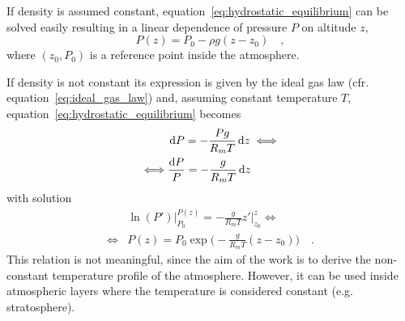 \documentclass[a4paper,10pt,twocolumn,\classoptions]{article}
\begin{document}
If density is assumed constant, equation~\eqref{eq:hydrostatic_equilibrium} can be solved easily resulting in a linear dependence of pressure $P$ on altitude $z$, %
\begin{equation}
  \label{eq:pressure_constant_density}
  P(z) = P_0 - \rho g (z - z_0)
  \quad ,
\end{equation}
where $(z_0, P_0)$ is a reference point inside the atmosphere.

If density is not constant its expression is given by the ideal gas law (cfr. equation~\eqref{eq:ideal_gas_law}) and, assuming constant temperature $T$, equation~\eqref{eq:hydrostatic_equilibrium} becomes
\begin{equation}
  \label{eq:hydrostatic_equilibrium_ideal_gas_law_constant_temperature}
  \begin{split}
    & \odif{P} = - \frac{P g}{R_m T} \odif{z} \iff \\
    \iff & \frac{\odif{P}}{P} = - \frac{g}{R_m T} \odif{z}
  \end{split}
\end{equation}
with solution
\begin{equation}
  \label{eq:pressure_constant_temperature}
  \begin{split}
    & \ln(P') \bigg|_{P_0}^{P(z)} = - \frac{g}{R_m T} z' \bigg|_{z_0}^{z} \iff \\
    \iff & P(z) = P_0 \exp{\bigg( - \frac{g}{R_m T} (z - z_0) \bigg)}
    \quad .
  \end{split}
\end{equation}
This relation is not meaningful, since the aim of the work is to derive the non-constant temperature profile of the atmosphere. However, it can be used inside atmospheric layers where the temperature is considered constant (e.g. stratosphere).
\end{document}

